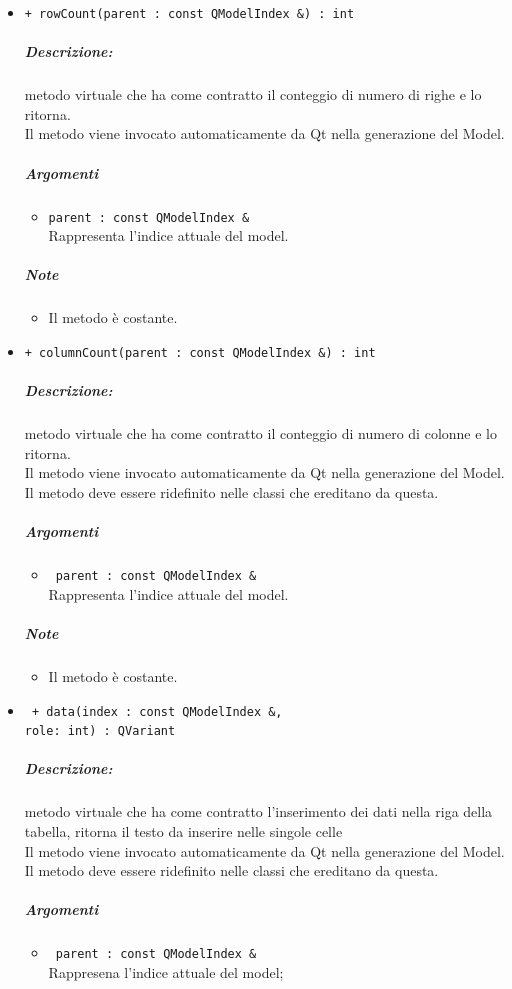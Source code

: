 {\begin{itemize}
	\item \color{blue}\verb!+ rowCount(parent : const QModelIndex &) : int!\\
	\color{black}
	\subparagraph{Descrizione:} metodo virtuale che ha come contratto il conteggio di numero di righe e lo ritorna.
	\\Il metodo viene invocato automaticamente da Qt\g{} nella generazione del Model.\\
	\subparagraph{Argomenti}
		\begin{itemize}
			\item \color{RoyalPurple}\verb!parent : const QModelIndex &!\\
			\color{Black}Rappresenta l'indice attuale del model.
		\end{itemize}
	\subparagraph{Note}
			\begin{itemize}
				\item Il metodo è costante.
			\end{itemize}
	
	\item \color{blue}\verb!+ columnCount(parent : const QModelIndex &) : int!\\
	\color{black}
	\subparagraph{Descrizione:} metodo virtuale che ha come contratto il conteggio di numero di colonne e lo ritorna.\\
	Il metodo viene invocato automaticamente da Qt\g{} nella generazione del Model.\\
	Il metodo deve essere ridefinito nelle classi che ereditano da questa.\\
	\subparagraph{Argomenti}
		\begin{itemize}
			\item \color{RoyalPurple}\verb! parent : const QModelIndex &!\\
			\color{black}Rappresenta l'indice attuale del model.
		\end{itemize}
	\subparagraph{Note}
			\begin{itemize}
				\item Il metodo è costante.
			\end{itemize}
		
	\item \color{blue}\verb! + data(index : const QModelIndex &, !\\
					\verb!role: int) : QVariant!\\
	\color{black}
	\subparagraph{Descrizione:} metodo virtuale che ha come contratto l'inserimento dei dati nella riga della tabella, ritorna il testo da inserire nelle singole celle\\
		Il metodo viene invocato automaticamente da Qt\g{} nella generazione del Model.\\
		Il metodo deve essere ridefinito nelle classi che ereditano da questa.\\
	\subparagraph{Argomenti}
		\begin{itemize}
			\item \color{RoyalPurple}\verb! parent : const QModelIndex &!\\
			\color{black}Rappresena l'indice attuale del model;
			

\end{itemize}
\end{itemize}}
